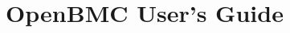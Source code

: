 \documentclass[]{article}
\begin{document}
\title{OpenBMC User's Guide}
\maketitle





\end{document}
